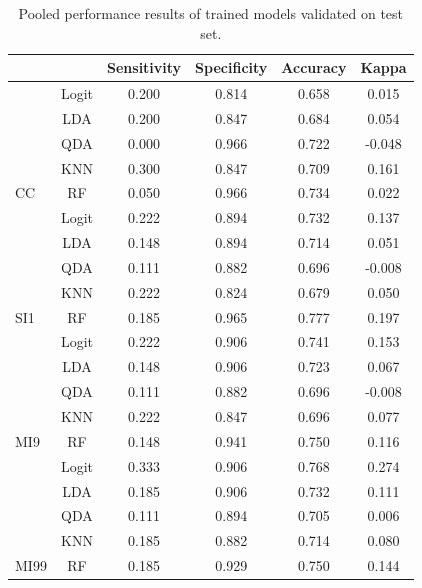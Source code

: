 \documentclass[12pt,]{article}
\begin{document}
\begin{table}[!h]

\caption{\label{tab:unnamed-chunk-6}\label{tab:metrics} Pooled performance results of trained models validated on test set.}
\centering
\fontsize{10}{12}\selectfont
\begin{tabular}{lccccc}
\toprule
 &  & Sensitivity & Specificity & Accuracy & Kappa\\
\midrule
 & Logit & 0.200 & 0.814 & 0.658 & 0.015\\

 & LDA & 0.200 & 0.847 & 0.684 & 0.054\\

 & QDA & 0.000 & 0.966 & 0.722 & -0.048\\

 & KNN & 0.300 & 0.847 & 0.709 & 0.161\\

\multirow{-5}{*}{\raggedright\arraybackslash CC} & RF & 0.050 & 0.966 & 0.734 & 0.022\\
\cmidrule{1-6}
 & Logit & 0.222 & 0.894 & 0.732 & 0.137\\

 & LDA & 0.148 & 0.894 & 0.714 & 0.051\\

 & QDA & 0.111 & 0.882 & 0.696 & -0.008\\

 & KNN & 0.222 & 0.824 & 0.679 & 0.050\\

\multirow{-5}{*}{\raggedright\arraybackslash SI1} & RF & 0.185 & 0.965 & 0.777 & 0.197\\
\cmidrule{1-6}
 & Logit & 0.222 & 0.906 & 0.741 & 0.153\\

 & LDA & 0.148 & 0.906 & 0.723 & 0.067\\

 & QDA & 0.111 & 0.882 & 0.696 & -0.008\\

 & KNN & 0.222 & 0.847 & 0.696 & 0.077\\

\multirow{-5}{*}{\raggedright\arraybackslash MI9} & RF & 0.148 & 0.941 & 0.750 & 0.116\\
\cmidrule{1-6}
 & Logit & 0.333 & 0.906 & 0.768 & 0.274\\

 & LDA & 0.185 & 0.906 & 0.732 & 0.111\\

 & QDA & 0.111 & 0.894 & 0.705 & 0.006\\

 & KNN & 0.185 & 0.882 & 0.714 & 0.080\\

\multirow{-5}{*}{\raggedright\arraybackslash MI99} & RF & 0.185 & 0.929 & 0.750 & 0.144\\
\bottomrule
\end{tabular}
\end{table}
\end{document}
